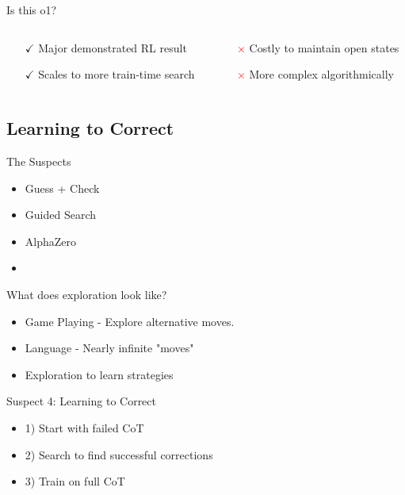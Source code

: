 \documentclass[14pt,aspectratio=169]{beamer}
\begin{document}
\begin{frame}{Is this o1?}
	\begin{columns}
		\begin{column}{0.5\linewidth}
			\begin{itemize}
				\item[$\boldsymbol{\checkmark}$] Major demonstrated RL result
				\item[$\boldsymbol{\checkmark}$] Scales to more train-time search
			\end{itemize}
		\end{column}
		\begin{column}{0.5\linewidth}
			\begin{itemize}
				\item[\textcolor{red}{$\boldsymbol{\times}$}] Costly to maintain open states
				\item[\textcolor{red}{$\boldsymbol{\times}$}] More complex algorithmically
			\end{itemize}
		\end{column}
	\end{columns}
\end{frame}

\subsection{Learning to Correct}

\begin{frame}{The Suspects}
	\begin{itemize}
		\item Guess + Check
		\item Guided Search
		\item AlphaZero
		\item {}
	\end{itemize}
\end{frame}

\begin{frame}{What does exploration look like?}
	\begin{itemize}
		\item Game Playing - Explore alternative moves.
		\item Language - Nearly infinite "moves"
		\item Exploration to learn strategies
	\end{itemize}

\end{frame}

\begin{frame}{Suspect 4: Learning to Correct}
	\begin{itemize}
		\item 1) Start with failed CoT
		\item 2) Search to find successful corrections
		\item 3) Train on full CoT
	\end{itemize}
\end{frame}
\end{document}

